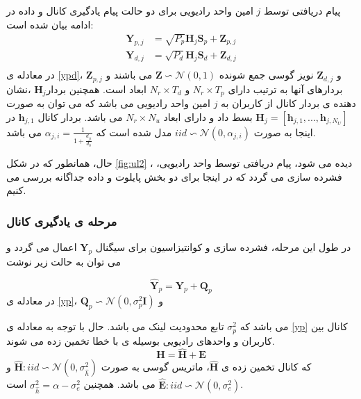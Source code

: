   
  پیام دریافتی توسط  $j$ امین واحد رادیویی برای دو حالت پیام یادگیری کانال و داده در ادامه بیان شده است:
  \begin{equation}\label{ypd}
  \begin{split}
 \boldsymbol{Y}_{p,j} &= \sqrt{P_p} \boldsymbol{H}_j \boldsymbol{S}_p + \boldsymbol{Z}_{p,j}\\
  \boldsymbol{Y}_{d,j} &= \sqrt{P_d} \boldsymbol{H}_j \boldsymbol{S}_d + \boldsymbol{Z}_{d,j}\\
 \end{split}
  \end{equation}
  در معادله ی \eqref{ypd}، $\boldsymbol{Z}_{p,j}$ و $\boldsymbol{Z}_{d,j}$ نویز گوسی جمع شونده
   $\boldsymbol{Z} \backsim \mathcal{N}(0,1)$ 
   می باشند و بردارهای آنها به ترتیب دارای $N_r \times T_p$ و
   $ N_r \times T_d$
     ابعاد است. همچنین بردار$\boldsymbol{H}_j $ ،نشان دهنده ی بردار کانال از کاربران به  $j$ امین واحد رادیویی می باشد که می توان به صورت $\boldsymbol{H}_j = [\boldsymbol{h}_{j,1},..., \boldsymbol{h}_{j,N_U}]$ بسط داد و دارای ابعاد  $N_r \times N_u$ می باشد.
    بردار کانال  
    $\boldsymbol{h}_{j,1}$
     در اینجا به صورت 
     $iid \backsim \mathcal{N}(0,\alpha_{j,i})$
       مدل شده است که 
      $\alpha_{j,i} = \frac{1}{1 + \frac{d_{ji}}{d_0}}$
      می باشد.
      
      حال، همانطور که در شکل \eqref{fig:ul2} ، دیده می شود، پیام دریافتی توسط واحد رادیویی، فشرده سازی می گردد \cite{uljmimo} که در اینجا برای دو بخش پایلوت و داده جداگانه بررسی می کنیم.
      \subsubsection{ مرحله ی یادگیری کانال   }
    در طول این مرحله، فشرده سازی و کوانتیزاسیون برای سیگنال   
    $ \boldsymbol{Y}_{p}$
    اعمال می گردد و می توان به حالت زیر نوشت
    
      \begin{equation}\label{yp}
      \hat{\boldsymbol{Y}}_{p} = \boldsymbol{Y}_{p} + \boldsymbol{Q}_{p}
      \end{equation}
      در معادله ی \eqref{yp}، 
       $\boldsymbol{Q}_{p} \backsim \mathcal{N}(0,\sigma_{p}^2 \boldsymbol{I} )$ 
         و 
       
         می باشد که
      $\sigma_{p}^2$
      تابع محدودیت لینک   
      می باشد.
       \newline
       حال با توجه به معادله ی  \eqref{yp}
       کانال بین کاربران و واحدهای رادیویی بوسیله ی  با خطا تخمین زده می شوند.
       \begin{equation}
       \boldsymbol{H} = \hat{\boldsymbol{H}} + \boldsymbol{E}
       \end{equation}
       که کانال تخمین زده ی $\hat{\boldsymbol{H}}$، ماتریس گوسی به صورت
        $\hat{\boldsymbol{H}} :iid \backsim \mathcal{N}(0,\sigma_{\hat{h}}^2)$ 
         و  $\hat{\boldsymbol{E}}: iid \backsim \mathcal{N}(0,\sigma_{e}^2)$  می باشد.
        همچنین $\sigma_{\hat{h}}^2 =\alpha - \sigma_{e}^2$ است.
      
